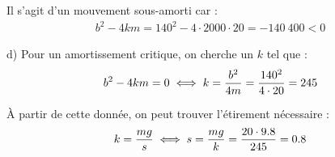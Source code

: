 Il s'agit d'un mouvement sous-amorti car :
\begin{align*}
    b^2 -4km = 140^2-4\cdot2000\cdot20 = -140\ 400 < 0
\end{align*}

d) Pour un amortissement critique, on cherche un $k$ tel que :
\begin{align*}
    b^2-4km = 0 \iff k = \dfrac{b^2}{4m} = \dfrac{140^2}{4\cdot 20} = 245
\end{align*}

À partir de cette donnée, on peut trouver l'étirement nécessaire :
\begin{align*}
    k = \dfrac{mg}{s} \iff s = \dfrac{mg}{k} = \dfrac{20\cdot 9.8}{245} = 0.8
\end{align*}
